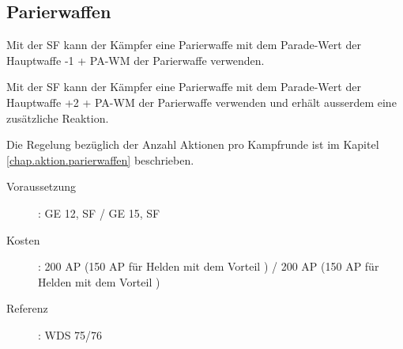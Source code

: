 \subsection{Parierwaffen}
\label{sf.parierwaffen}
Mit der SF  kann der Kämpfer eine Parierwaffe mit dem Parade-Wert der Hauptwaffe -1 + PA-WM der Parierwaffe verwenden.

Mit der SF  kann der Kämpfer eine Parierwaffe mit dem Parade-Wert der Hauptwaffe +2 + PA-WM der Parierwaffe verwenden und erhält ausserdem eine zusätzliche Reaktion.

Die Regelung bezüglich der Anzahl Aktionen pro Kampfrunde ist im Kapitel \ref{chap.aktion.parierwaffen} beschrieben.
\begin{description}
    \item[Voraussetzung]:
        GE 12, SF  / GE 15, SF 
    \item [Kosten]:
        200 AP (150 AP für Helden mit dem Vorteil ) / 200 AP (150 AP für Helden mit dem Vorteil )
    \item [Referenz]:
        WDS 75/76
\end{description}

